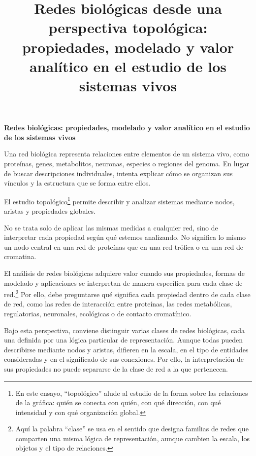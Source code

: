 \documentclass[11pt]{article}
\title{\textbf{Redes biológicas desde una perspectiva topológica: \\propiedades, modelado y valor analítico en el estudio de los sistemas vivos}}
\author{}
\date{}
\newcommand{\essaydisplayfont}{\rmfamily}
\newcommand{\essaytitle}{Redes biol\'ogicas: propiedades, modelado y valor anal\'itico en el estudio de los sistemas vivos}
\newcommand{\essaytitleblock}{%
  \begin{center}
    {\essaydisplayfont\fontsize{18}{22}\selectfont\bfseries \essaytitle\par}
    \vspace{0.85em}
  \end{center}
}
\begin{document}
\essaytitleblock


Una red biológica representa relaciones entre elementos de un sistema vivo, como proteínas, genes, metabolitos, neuronas, especies o regiones del genoma. En lugar de buscar descripciones individuales, intenta explicar cómo se organizan sus vínculos y la estructura que se forma entre ellos. 

El estudio topológico\footnote{En este ensayo, \enquote{topológico} alude al estudio de la forma sobre las relaciones de la gráfica: quién se conecta con quién, con qué dirección, con qué intensidad y con qué organización global.} permite describir y analizar sistemas mediante nodos, aristas y propiedades globales. 

No se trata solo de aplicar las mismas medidas a cualquier red, sino de interpretar cada propiedad según qué estemos analizando. No significa lo mismo un nodo central en una red de proteínas que en una red trófica o en una red de cromatina.

El análisis de redes biológicas adquiere valor cuando sus propiedades, formas de modelado y aplicaciones se interpretan de manera específica para cada clase de red.\footnote{Aquí la palabra \enquote{clase} se usa en el sentido que designa familias de redes que comparten una misma lógica de representación, aunque cambien la escala, los objetos y el tipo de relaciones.} Por ello, debe preguntarse qué significa cada propiedad dentro de cada clase de red, como las redes de interacción entre proteínas, las redes metabólicas, regulatorias, neuronales, ecológicas o de contacto cromatínico.



Bajo esta perspectiva, conviene distinguir varias clases de redes biológicas, cada una definida por una lógica particular de representación. Aunque todas pueden describirse mediante nodos y aristas, difieren en la escala, en el tipo de entidades consideradas y en el significado de sus conexiones. Por ello, la interpretación de sus propiedades no puede separarse de la clase de red a la que pertenecen.
\end{document}
